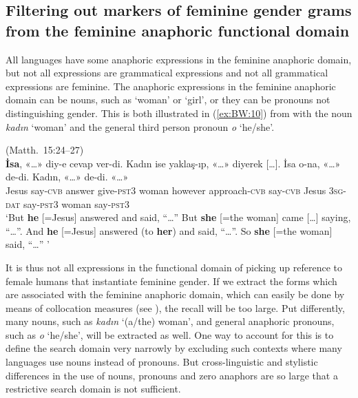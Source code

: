 \documentclass[output=collectionpaper]{langsci/langscibook}
\begin{document}
\subsection{Filtering out markers of feminine gender grams from the feminine anaphoric functional domain}
\label{sec:BW:2.4}

All languages have some anaphoric expressions in the feminine anaphoric domain, but not all expressions are grammatical expressions and not all grammatical expressions are feminine. The anaphoric expressions in the feminine anaphoric domain can be nouns, such as ‘woman’ or ‘girl’, or they can be pronouns not distinguishing gender. This is both illustrated in (\ref{ex:BW:10}) from  with the noun \textit{kadın} ‘woman’ and the general third person pronoun \textit{o} ‘he/she’.

\ea\label{ex:BW:10}
 (Matth.~15:24–27)\\
\gll \textbf{İsa}, «\ldots»	diy-e	cevap	ver-di.	Kadın	ise	yaklaş-ıp, «\ldots»	diyerek [\ldots]. İsa	o-na, «\ldots»	de-di.	Kadın, «\ldots»	de-di. «\ldots»\\
Jesus	{} say-\textsc{cvb}	answer	give-\textsc{pst3}	woman	however	approach-\textsc{cvb} {} say-\textsc{cvb} {} Jesus	\textsc{3sg-dat} {}	say-\textsc{pst3}	woman {}	say-\textsc{pst3} {}\\
\glt ‘But \textbf{he} [=Jesus] answered and said, “\ldots” But \textbf{she} [=the woman] came [\ldots] saying, “\ldots”. And \textbf{he} [=Jesus] answered (to \textbf{her}) and said, “\ldots”. So \textbf{she} [=the woman] said, “\ldots” ’
\z

It is thus not all expressions in the functional domain of picking up reference to female humans that instantiate feminine gender. If we extract the forms which are associated with the feminine anaphoric domain, which can easily be done by means of collocation measures (see ), the recall will be too large. Put differently, many nouns, such as  \textit{kadın} ‘(a/the) woman’, and general anaphoric pronouns, such as  \textit{o} ‘he/she’, will be extracted as well. One way to account for this is to define the search domain very narrowly by excluding such contexts where many languages use nouns instead of pronouns. But cross-linguistic and stylistic differences in the use of nouns, pronouns and zero anaphors are so large that a restrictive search domain is not sufficient.
\end{document}
